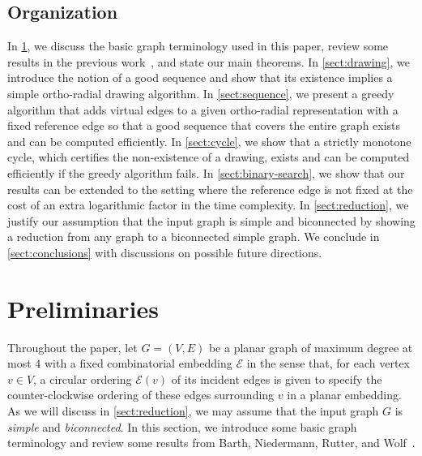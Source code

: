 \documentclass{article}\usepackage[a4paper,margin=20mm]{geometry}
\newcommand{\EE}{\mathcal{E}}
\begin{document}
\subsection{Organization}

In \cref{sect:prelim}, we discuss the basic graph terminology used in this paper, review some results in the previous work~\cite{barth2023topology}, and state our main theorems. In \cref{sect:drawing}, we introduce the notion of a good sequence and  show that its existence implies a simple  ortho-radial drawing algorithm. In \cref{sect:sequence}, we present a greedy algorithm that adds virtual edges to a given ortho-radial representation with a fixed reference edge so that a good sequence that covers the entire graph exists and can be computed efficiently. In \cref{sect:cycle}, we show that a strictly monotone cycle, which certifies the non-existence of a drawing, exists and can be computed efficiently if the greedy algorithm fails. In \cref{sect:binary-search}, we show that our results can be extended to the setting where the reference edge is not fixed at the cost of an extra logarithmic factor in the time complexity.
In \cref{sect:reduction}, we justify our assumption that the input graph is simple and  biconnected by showing a reduction from any graph to a  biconnected simple graph. We conclude in \cref{sect:conclusions} with discussions on possible future directions.

\section{Preliminaries}\label{sect:prelim}

Throughout the paper, let $G=(V,E)$ be a planar graph of maximum degree at most $4$ with a fixed combinatorial embedding $\EE$ in the sense that, for each vertex $v \in V$, a circular ordering $\EE(v)$ of its incident edges is given to specify the counter-clockwise ordering of these edges surrounding $v$ in a planar embedding. As we will discuss in \cref{sect:reduction}, we may assume that the input graph $G$ is \emph{simple} and \emph{biconnected}. 
In this section, we introduce some basic graph terminology and review some results from Barth, Niedermann, Rutter, and Wolf~\cite{barth2023topology}.
\end{document}
